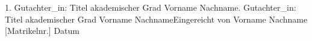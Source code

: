 \begin{titlepage}
\begin{center}
        1. Gutachter\_in: Titel akademischer Grad Vorname Nachname. Gutachter\_in: Titel akademischer Grad Vorname Nachname\linebreak[4]
        \linebreak[4]
        \linebreak[4]
        \linebreak[4]
        \linebreak[4]
        Eingereicht von Vorname Nachname [Matrikelnr.]
        \linebreak[4]
        \linebreak[4]
        \linebreak[4]
        \linebreak[4]
        Datum

    \end{center}
\end{titlepage}